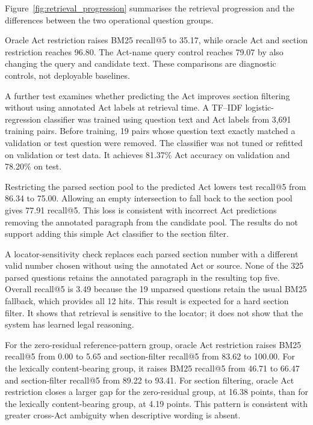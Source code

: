 \documentclass[pdflatex,sn-basic]{sn-jnl}%
\theoremstyle{thmstyleone}%
\theoremstyle{thmstyletwo}%
\theoremstyle{thmstylethree}%
\begin{document}
Figure~\ref{fig:retrieval_progression} summarises the retrieval progression
and the differences between the two operational question groups.

Oracle Act restriction raises BM25 recall@5 to 35.17, while oracle Act and
section restriction reaches 96.80. The Act-name query control reaches 79.07
by also changing the query and candidate text. These comparisons are
diagnostic controls, not deployable baselines.

A further test examines whether predicting the Act improves section filtering
without using annotated Act labels at retrieval time. A TF--IDF
logistic-regression classifier was trained using question text and Act labels
from 3,691 training pairs. Before training, 19 pairs whose question text
exactly matched a validation or test question were removed. The classifier
was not tuned or refitted on validation or test data. It achieves 81.37\%
Act accuracy on validation and 78.20\% on test.

Restricting the parsed section pool to the predicted Act lowers test
recall@5 from 86.34 to 75.00. Allowing an empty intersection to fall back to
the section pool gives 77.91 recall@5. This loss is consistent with incorrect
Act predictions removing the annotated paragraph from the candidate pool.
The results do not support adding this simple Act classifier to the section
filter.

A locator-sensitivity check replaces each parsed section number with a
different valid number chosen without using the annotated Act or source.
None of the 325 parsed questions retains the annotated paragraph in the
resulting top five. Overall recall@5 is 3.49 because the 19 unparsed questions
retain the usual BM25 fallback, which provides all 12 hits. This result is
expected for a hard section filter. It shows that retrieval is sensitive to
the locator; it does not show that the system has learned legal reasoning.

For the zero-residual reference-pattern group, oracle Act restriction raises
BM25 recall@5 from 0.00 to 5.65 and section-filter recall@5 from 83.62 to
100.00. For the lexically content-bearing group, it raises BM25 recall@5
from 46.71 to 66.47 and section-filter recall@5 from 89.22 to 93.41.
For section filtering, oracle Act restriction closes a larger gap for the
zero-residual group, at 16.38 points, than for the lexically content-bearing
group, at 4.19 points. This pattern is consistent with greater cross-Act
ambiguity when descriptive wording is absent.
\end{document}
